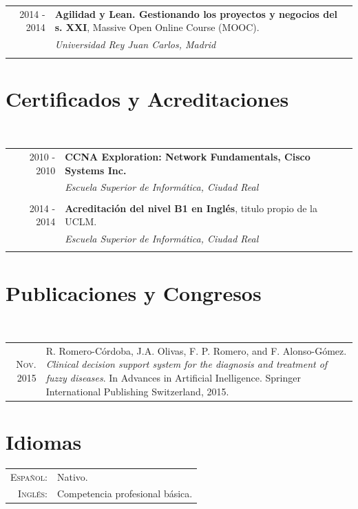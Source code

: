 \documentclass[runningheads,a4paper]{llncs}
\theoremstyle{break}
\begin{document}
\begin{tabular}{rp{11cm}}

     \textsc{2014 - 2014} & \textbf{Agilidad y Lean. Gestionando los proyectos y negocios del s. XXI}, Massive Open Online Course (MOOC).\\
  & \emph{Universidad Rey Juan Carlos, Madrid}\\\\

\end{tabular}
\section*{Certificados y Acreditaciones}
\textbf{}\\

\begin{tabular}{rp{11cm}}
 \textsc{2010 - 2010} & \textbf{CCNA Exploration: Network Fundamentals, Cisco Systems Inc.}\\
  & \emph{Escuela Superior de Informática, Ciudad Real}\\\\

   \textsc{2014 - 2014} & \textbf{Acreditación del nivel B1 en Inglés}, titulo propio de la UCLM.\\
  & \emph{Escuela Superior de Informática, Ciudad Real}\\\\
\end{tabular}


\section*{Publicaciones y Congresos}
\textbf{}\\

\begin{tabular}{rp{11cm}}
   \textsc{Nov.} 2015 & R. Romero-Córdoba, J.A. Olivas, F. P. Romero, and F. Alonso-Gómez. \emph{Clinical decision support system for the diagnosis and treatment of fuzzy diseases}. In Advances in Artificial Inelligence. Springer International Publishing Switzerland, 2015.
\end{tabular}

\section*{Idiomas}
\begin{tabular}{rl}
 \textsc{Español:}& Nativo.\\
\textsc{Inglés:}& Competencia profesional básica.\\
\end{tabular}

\pagebreak
\end{document}
